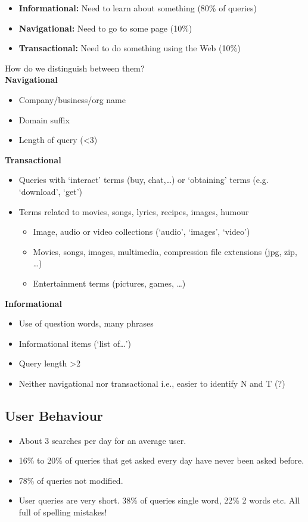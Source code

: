 \documentclass[11pt]{article}
\begin{document}
\begin{itemize}
    \item \textbf{Informational:} Need to learn about something (80\% of queries)
    \item \textbf{Navigational:} Need to go to some page (10\%)
    \item \textbf{Transactional:} Need to do something using the Web (10\%)
\end{itemize}
How do we distinguish between them?\\
\newline
\textbf{Navigational}
\begin{itemize}
    \item Company/business/org name
    \item Domain suffix
    \item Length of query (\textless3)
\end{itemize}
\newpage
\textbf{Transactional}
\begin{itemize}
    \item Queries with ‘interact’ terms (buy, chat,…) or ‘obtaining’ terms
(e.g. ‘download’, ‘get’)
    \item Terms related to movies, songs, lyrics, recipes, images, humour
    \begin{itemize}
        \item Image, audio or video collections (‘audio’, ‘images’, ‘video’)
        \item Movies, songs, images, multimedia, compression file extensions
(jpg, zip, …)
        \item Entertainment terms (pictures, games, …)
    \end{itemize}
\end{itemize}
\textbf{Informational}
\begin{itemize}
    \item Use of question words, many phrases
    \item Informational items (‘list of…’)
    \item Query length \textgreater2
    \item Neither navigational nor transactional i.e., easier to identify
N and T (?)
\end{itemize}
\subsection{User Behaviour}
\begin{itemize}
    \item About 3 searches per day for an average user.
    \item 16\% to 20\% of queries that get asked every day have
    never been asked before.
    \item 78\% of queries not modified.
    \item User queries are very short. 38\% of queries single word, 22\% 2 words etc. All full of spelling mistakes!
\end{itemize}
\end{document}
